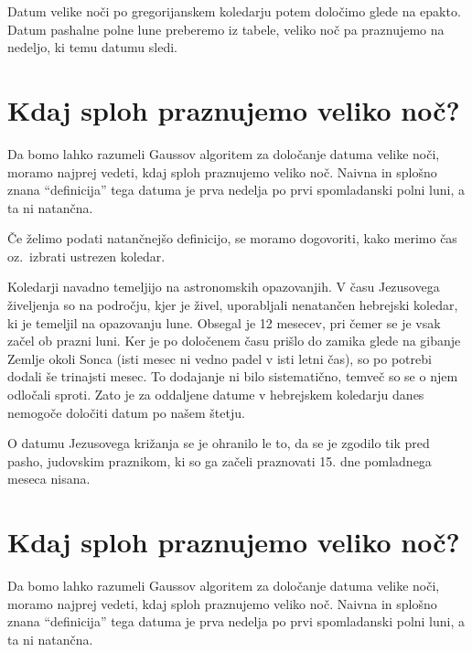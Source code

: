 Datum velike noči po gregorijanskem koledarju potem določimo glede na epakto.
Datum pashalne polne lune preberemo iz tabele, veliko noč pa praznujemo na 
nedeljo, ki temu datumu sledi.




\section{Kdaj sploh praznujemo veliko noč?}

Da bomo lahko razumeli Gaussov algoritem za določanje datuma velike noči, 
moramo najprej vedeti, kdaj sploh praznujemo veliko noč. Naivna in splošno 
znana ``definicija'' tega datuma je prva nedelja po prvi spomladanski polni 
luni, a ta ni natančna.

Če želimo podati natančnejšo definicijo, se moramo dogovoriti, kako merimo 
čas oz.\ izbrati ustrezen koledar.

Koledarji navadno temeljijo na astronomskih opazovanjih.
V času Jezusovega živeljenja so na področju, kjer je živel, uporabljali 
nenatančen hebrejski koledar, ki je temeljil na opazovanju lune. Obsegal je
12 mesecev, pri čemer se je vsak začel ob prazni luni. Ker je po določenem
času prišlo do zamika glede na gibanje Zemlje okoli Sonca (isti mesec ni vedno 
padel v isti letni čas), so po potrebi dodali še trinajsti mesec. To 
dodajanje ni bilo sistematično, temveč so se o njem odločali sproti. 
Zato je za oddaljene datume v hebrejskem koledarju danes nemogoče določiti 
datum po našem štetju.

O datumu Jezusovega križanja se je ohranilo le to, da se je zgodilo tik 
pred pasho, judovskim praznikom, ki so ga začeli praznovati 15. dne 
pomladnega meseca nisana.




\section{Kdaj sploh praznujemo veliko noč?}

Da bomo lahko razumeli Gaussov algoritem za določanje datuma velike noči, 
moramo najprej vedeti, kdaj sploh praznujemo veliko noč. Naivna in splošno 
znana ``definicija'' tega datuma je prva nedelja po prvi spomladanski polni 
luni, a ta ni natančna.

